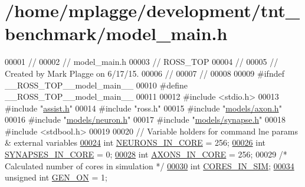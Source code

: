 \hypertarget{model__main_8h_source}{}\section{/home/mplagge/development/tnt\+\_\+benchmark/model\+\_\+main.h}

\begin{DoxyCode}
00001 \textcolor{comment}{//}
00002 \textcolor{comment}{//  model\_main.h}
00003 \textcolor{comment}{//  ROSS\_TOP}
00004 \textcolor{comment}{//}
00005 \textcolor{comment}{//  Created by Mark Plagge on 6/17/15.}
00006 \textcolor{comment}{//}
00007 \textcolor{comment}{//}
00008 
00009 \textcolor{preprocessor}{#ifndef \_\_ROSS\_TOP\_\_model\_main\_\_}
00010 \textcolor{preprocessor}{#define \_\_ROSS\_TOP\_\_model\_main\_\_}
00011 
00012 \textcolor{preprocessor}{#include <stdio.h>}
00013 \textcolor{preprocessor}{#include "\hyperlink{assist_8h}{assist.h}"}
00014 \textcolor{preprocessor}{#include "ross.h"}
00015 \textcolor{preprocessor}{#include "\hyperlink{axon_8h}{models/axon.h}"}
00016 \textcolor{preprocessor}{#include "\hyperlink{neuron_8h}{models/neuron.h}"}
00017 \textcolor{preprocessor}{#include "\hyperlink{synapse_8h}{models/synapse.h}"}
00018 \textcolor{preprocessor}{#include <stdbool.h>}
00019 
00020         \textcolor{comment}{// Variable holders for command lne params & external variables}
\hypertarget{model__main_8h_source_l00024}{}\hyperlink{model__main_8h_a67e8e45768f76b984a60fcff2b7c51aa}{00024} \textcolor{comment}{}\textcolor{keywordtype}{int} \hyperlink{model__main_8h_a67e8e45768f76b984a60fcff2b7c51aa}{NEURONS\_IN\_CORE} = 256;
\hypertarget{model__main_8h_source_l00026}{}\hyperlink{model__main_8h_a076b99099b46431255982b2bb8ce06fb}{00026} \textcolor{keywordtype}{int} \hyperlink{model__main_8h_a076b99099b46431255982b2bb8ce06fb}{SYNAPSES\_IN\_CORE} = 0;
\hypertarget{model__main_8h_source_l00028}{}\hyperlink{model__main_8h_a519a06367b2b3f793c56d3ab78f5b2ef}{00028} \textcolor{keywordtype}{int} \hyperlink{model__main_8h_a519a06367b2b3f793c56d3ab78f5b2ef}{AXONS\_IN\_CORE} = 256;
00029 \textcolor{comment}{/* Calculated number of cores in simulation */}
\hypertarget{model__main_8h_source_l00030}{}\hyperlink{model__main_8h_a142b2655c5a899956164ef4e1c394fea}{00030} \textcolor{keywordtype}{int} \hyperlink{model__main_8h_a142b2655c5a899956164ef4e1c394fea}{CORES\_IN\_SIM};
\hypertarget{model__main_8h_source_l00034}{}\hyperlink{model__main_8h_a74019486208bb1d640927710d5344a94}{00034} \textcolor{keywordtype}{unsigned} \textcolor{keywordtype}{int} \hyperlink{model__main_8h_a74019486208bb1d640927710d5344a94}{GEN\_ON} = 1;

\end{DoxyCode}

